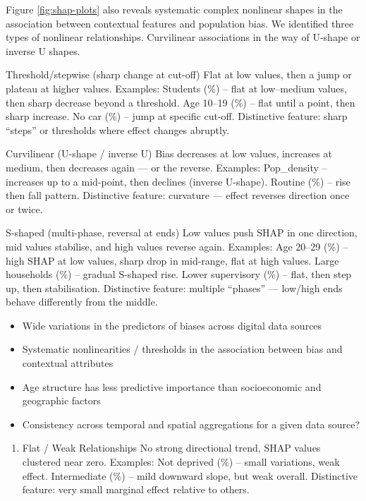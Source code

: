 \documentclass[]{rsos}%
\providecommand{\tightlist}{%
  \setlength{\itemsep}{0pt}\setlength{\parskip}{0pt}}
\begin{document}
Figure \ref{fig:shap-plots} also reveals systematic complex nonlinear shapes in the association between contextual features and population bias. We identified three types of nonlinear relationships. Curvilinear associations in the way of U-shape or inverse U shapes.

Threshold/stepwise (sharp change at cut-off)
Flat at low values, then a jump or plateau at higher values.
Examples:
Students (\%) -- flat at low--medium values, then sharp decrease beyond a threshold.
Age 10--19 (\%) -- flat until a point, then sharp increase.
No car (\%) -- jump at specific cut-off.
Distinctive feature: sharp ``steps'' or thresholds where effect changes abruptly.

Curvilinear (U-shape / inverse U)
Bias decreases at low values, increases at medium, then decreases again --- or the reverse.
Examples:
Pop\_density -- increases up to a mid-point, then declines (inverse U-shape).
Routine (\%) -- rise then fall pattern.
Distinctive feature: curvature --- effect reverses direction once or twice.

S-shaped (multi-phase, reversal at ends)
Low values push SHAP in one direction, mid values stabilise, and high values reverse again.
Examples:
Age 20--29 (\%) -- high SHAP at low values, sharp drop in mid-range, flat at high values.
Large households (\%) -- gradual S-shaped rise.
Lower supervisory (\%) -- flat, then step up, then stabilisation.
Distinctive feature: multiple ``phases'' --- low/high ends behave differently from the middle.

\begin{itemize}
\tightlist
\item
  Wide variations in the predictors of biases across digital data sources\\
\item
  Systematic nonlinearities / thresholds in the association between bias and contextual attributes\\
\item
  Age structure has less predictive importance than socioeconomic and geographic factors\\
\item
  Consistency across temporal and spatial aggregations for a given data source?
\end{itemize}

\begin{enumerate}
\def\labelenumi{\arabic{enumi}.}
\setcounter{enumi}{4}
\tightlist
\item
  Flat / Weak Relationships
  No strong directional trend, SHAP values clustered near zero.
  Examples:
  Not deprived (\%) -- small variations, weak effect.
  Intermediate (\%) -- mild downward slope, but weak overall.
  Distinctive feature: very small marginal effect relative to others.
\end{enumerate}
\end{document}
